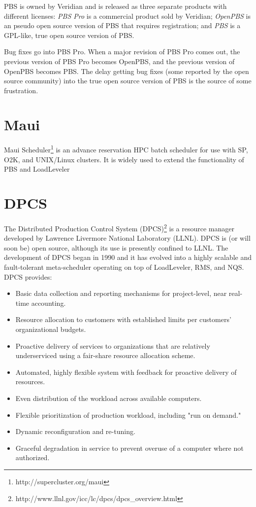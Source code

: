 \documentclass{article}
\begin{document}
PBS is owned by Veridian and is released as three separate products with
different licenses: {\em PBS Pro} is a commercial product sold by Veridian;
{\em OpenPBS} is an pseudo open source version of PBS that requires
registration; and
{\em PBS} is a GPL-like, true open source version of PBS.

Bug fixes go into PBS Pro.  When a major revision of PBS Pro comes out,
the previous version of PBS Pro becomes OpenPBS, and the previous version
of OpenPBS becomes PBS.  The delay getting bug fixes (some reported by the
open source community) into the true open source version of PBS is the source
of some frustration.

\section{Maui}

Maui Scheduler\footnote{http://supercluster.org/maui}
is an advance reservation HPC batch scheduler for use with SP,
O2K, and UNIX/Linux clusters. It is widely used to extend the
functionality of PBS and LoadLeveler

\section{DPCS}

The Distributed Production Control System (DPCS)\footnote{
http://www.llnl.gov/icc/lc/dpcs/dpcs\_overview.html}
is a resource manager developed by Lawrence Livermore National Laboratory (LLNL).
DPCS is (or will soon be) open source, although its use is presently
confined to LLNL. The development of DPCS began in 1990 and it has
evolved into a highly scalable and fault-tolerant meta-scheduler
operating on top of LoadLeveler, RMS, and NQS. DPCS provides:
\begin{itemize}
\item Basic data collection and reporting mechanisms for project-level,
      near real-time accounting.
\item Resource allocation to customers with established limits per
      customers' organizational budgets.
\item Proactive delivery of services to organizations that are relatively
      underserviced using a fair-share resource allocation scheme.
\item Automated, highly flexible system with feedback for proactive delivery
      of resources.
\item Even distribution of the workload across available computers.
\item Flexible prioritization of production workload, including "run on demand."
\item Dynamic reconfiguration and re-tuning.
\item Graceful degradation in service to prevent overuse of a computer where
      not authorized.
\end{itemize}
\end{document}
